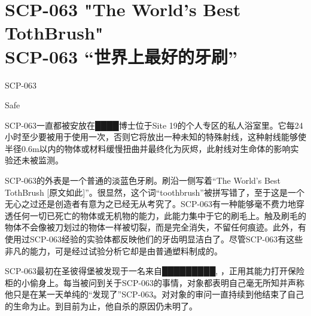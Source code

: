 \chapter[SCP-063 “世界上最好的牙刷”]{
    SCP-063 "The World's Best TothBrush"\\
    SCP-063 “世界上最好的牙刷”
}

\label{chap:SCP-063}

SCP-063

Safe

SCP-063一直都被安放在████博士位于Site 19的个人专区的私人浴室里。它每24小时至少要被用于使用一次，否则它将放出一种未知的特殊射线，这种射线能够使半径0.6m以内的物体或材料缓慢扭曲并最终化为灰烬，此射线对生命体的影响实验还未被监测。

SCP-063的外表是一个普通的淡蓝色牙刷。刷沿一侧写着“The World's Best TothBrush {[}原文如此]”。很显然，这个词“toothbrush”被拼写错了，至于这是一个无心之过还是创造者有意为之已经无从考究了。SCP-063有一种能够毫不费力地穿透任何一切已死亡的物体或无机物的能力，此能力集中于它的刷毛上。触及刷毛的物体不会像被刀划过的物体一样被切裂，而是完全消失，不留任何痕迹。此外，有使用过SCP-063经验的实验体都反映他们的牙齿明显洁白了。尽管SCP-063有这些非凡的能力，可是经过试验分析它却是由普通塑料制成的。

SCP-063最初在圣彼得堡被发现于一名来自█████████, ，正用其能力打开保险柜的小偷身上。每当被问到关于SCP-063的事情，对象都表明自己毫无所知并声称他只是在某一天单纯的“发现了”SCP-063。对对象的审问一直持续到他结束了自己的生命为止。到目前为止，他自杀的原因仍未明了。
